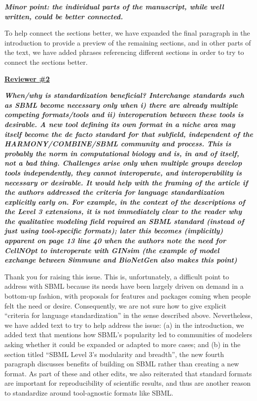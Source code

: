 \documentclass[11pt]{mhletter}
\begin{document}
\textbf{\textit{Minor point: the individual parts of the manuscript, while well written, could be better connected.}}

To help connect the sections better, we have expanded the final paragraph in the introduction to provide a preview of the remaining sections, and in other parts of the text, we have added phrases referencing different sections in order to try to connect the sections better.


\clearpage
\textbf{\underline{Reviewer \#2}}

\textbf{\textit{When/why is standardization beneficial? Interchange standards such as SBML become necessary only when i) there are already multiple competing formats/tools and ii) interoperation between these tools is desirable. A new tool defining its own format in a niche area may itself become the de facto standard for that subfield, independent of the HARMONY/COMBINE/SBML community and process. This is probably the norm in computational biology and is, in and of itself, not a bad thing. Challenges arise only when multiple groups develop tools independently, they cannot interoperate, and interoperability is necessary or desirable. It would help with the framing of the article if the authors addressed the criteria for language standardization explicitly early on. For example, in the context of the descriptions of the Level 3 extensions, it is not immediately clear to the reader why the qualitative modeling field required an SBML standard (instead of just using tool-specific formats); later this becomes (implicitly) apparent on page 13 line 40 when the authors note the need for CellNOpt to interoperate with GINsim (the example of model exchange between Simmune and BioNetGen also makes this point)}}

Thank you for raising this issue.  This is, unfortunately, a difficult point to address with SBML because its needs have been largely driven on demand in a bottom-up fashion, with proposals for features and packages coming when people felt the need or desire.  Consequently, we are not sure how to give explicit ``criteria for language standardization'' in the sense described above.  Nevertheless, we have added text to try to help address the issue: (a) in the introduction, we added text that mentions how SBML's popularity led to communities of modelers asking whether it could be expanded or adapted to more cases; and (b) in the section titled ``SBML Level 3's modularity and breadth'', the new fourth paragraph discusses benefits of building on SBML rather than creating a new format.  As part of these and other edits, we also reiterated that standard formats are important for reproducibility of scientific results, and thus are another reason to standardize around tool-agnostic formats like SBML.
\end{document}
